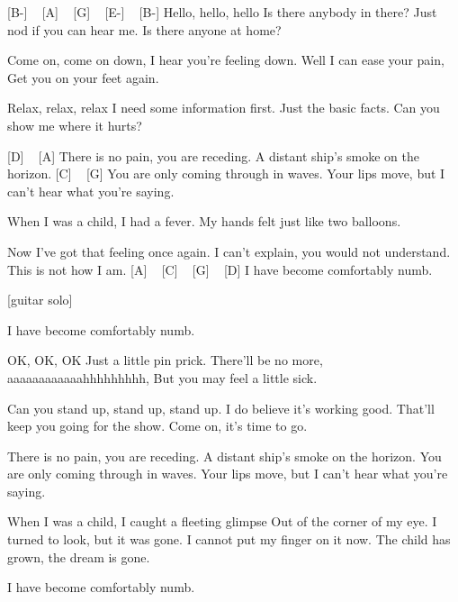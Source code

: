 
[B-] ~ [A] ~ [G] ~ [E-] ~ [B-]
Hello, hello, hello
Is there anybody in there?
Just nod if you can hear me.
Is there anyone at home?


Come on, come on down,
I hear you're feeling down.
Well I can ease your pain,
Get you on your feet again.

Relax, relax, relax
I need some information first.
Just the basic facts.
Can you show me where it hurts?

[D] ~ [A] 
There is no pain, you are receding.
A distant ship's smoke on the horizon.
[C] ~ [G] 
You are only coming through in waves.
Your lips move, but I can't hear what you're saying.

When I was a child, I had a fever.
My hands felt just like two balloons.

Now I've got that feeling once again.
I can't explain, you would not understand.
This is not how I am.
[A] ~ [C] ~ [G] ~ [D]
I have become comfortably numb.

[guitar solo]

I have become comfortably numb.

OK, OK, OK
Just a little pin prick.
There'll be no more, aaaaaaaaaaaahhhhhhhhh,
But you may feel a little sick.

Can you stand up, stand up, stand up.
I do believe it's working good.
That'll keep you going for the show.
Come on, it's time to go.

There is no pain, you are receding.
A distant ship's smoke on the horizon.
You are only coming through in waves.
Your lips move, but I can't hear what you're saying.

When I was a child, I caught a fleeting glimpse
Out of the corner of my eye.
I turned to look, but it was gone.
I cannot put my finger on it now.
The child has grown, the dream is gone.

I have become comfortably numb. 